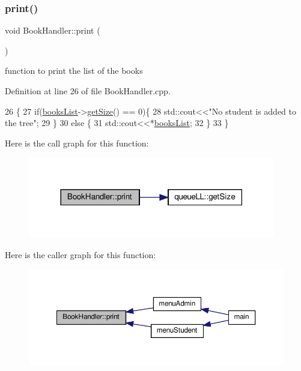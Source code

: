 \subsubsection{\texorpdfstring{print()}{print()}}
{\footnotesize\ttfamily void Book\+Handler\+::print (\begin{DoxyParamCaption}{ }\end{DoxyParamCaption})}

function to print the list of the books 

Definition at line 26 of file Book\+Handler.\+cpp.


\begin{DoxyCode}
26                         \{
27     \textcolor{keywordflow}{if}(\hyperlink{class_book_handler_a13a6c78422b3ad7acd5ebdb9555a0286}{booksList}->\hyperlink{classqueue_l_l_a8969feebcb563f0b489bc112422b9563}{getSize}() == 0)\{
28         std::cout<<\textcolor{stringliteral}{"No student is added to the tree"};
29     \}
30     \textcolor{keywordflow}{else} \{
31         std::cout<<*\hyperlink{class_book_handler_a13a6c78422b3ad7acd5ebdb9555a0286}{booksList};
32     \}
33 \}
\end{DoxyCode}
Here is the call graph for this function\+:
\nopagebreak
\begin{figure}[H]
\begin{center}
\leavevmode
\includegraphics[width=306pt]{class_book_handler_ac6e2d4211b55e636348daaa9253a2d12_cgraph}
\end{center}
\end{figure}
Here is the caller graph for this function\+:
\nopagebreak
\begin{figure}[H]
\begin{center}
\leavevmode
\includegraphics[width=350pt]{class_book_handler_ac6e2d4211b55e636348daaa9253a2d12_icgraph}
\end{center}
\end{figure}
\mbox{\label{class_book_handler_a6794f0f693ff3048df64a5b254c183af}} 
